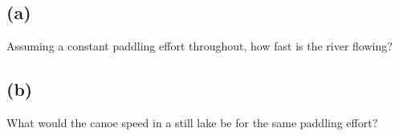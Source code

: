 \documentclass[12pt]{article}
\begin{document}
\subsection*{(a)}
Assuming a constant paddling effort throughout, how fast is the river flowing? 

\subsection*{(b)}
What would the canoe speed in a still lake be for the same paddling effort?
	
 
\end{document}

